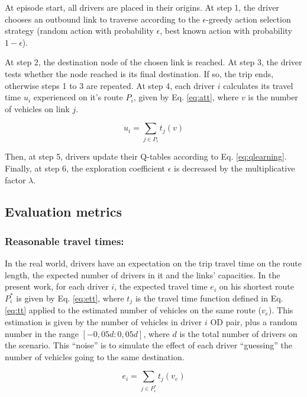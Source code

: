 \documentclass{RITA}
\newcommand{\route}[1]{\ensuremath{P_#1}}	%
\newcommand{\optRoute}[1]{\ensuremath{P_#1^*}}	%
\newcommand{\travTime}{\ensuremath{t_j}} 	%
\newcommand{\veh}{\ensuremath{v}}		%
\newcommand{\ett}[1]{\ensuremath{e_#1}}		%
\newcommand{\expVeh}{\ensuremath{v_e}}		%
\newcommand{\att}[1]{\ensuremath{u_#1}}		%
\begin{document}
At episode start, all drivers are placed in their origins. At step 1, the driver chooses an outbound link to traverse according to the $\epsilon$-greedy action selection strategy (random action with probability $\epsilon$, best known action with probability $1 - \epsilon$). %

At step 2, the destination node of the chosen link is reached. At step 3, the driver tests whether the node reached is its final destination. If so, the trip ends, otherwise steps 1 to 3 are repeated. At step 4, each driver $i$ calculates its travel time $\att{i}$ experienced on it's route $\route{i}$, given by Eq. \eqref{eq:att}, where $\veh$ is the number of vehicles on link $j$.

\begin{equation}
\label{eq:att}
\att{i} = \sum_{j \in \route{i}} \travTime(\veh)
\end{equation}


Then, at step 5, drivers update their Q-tables according to Eq. \eqref{eq:qlearning}. Finally, at step 6, the exploration coefficient $\epsilon$ is decreased by the multiplicative factor $\lambda$.

\subsection{Evaluation metrics}

\subsubsection{Reasonable travel times:}
In the real world, drivers have an expectation on the trip travel time on the route length, the expected number of drivers in it and the links' capacities. In the present work, for each driver $i$, the expected travel time $\ett{i}$ on his shortest route \optRoute{i} is given by Eq. \eqref{eq:ett}, where $\travTime$ is the travel time function defined in Eq. \eqref{eq:tt} applied to the estimated number of vehicles on the same route ($\expVeh$). This estimation is given by the number of vehicles in driver $i$ OD pair, plus a random number in the range $[-0,05d:0,05d]$, where $d$ is the total number of drivers on the scenario. This ``noise'' is to simulate the effect of each driver ``guessing'' the number of vehicles going to the same destination.

\begin{equation}
\label{eq:ett}
\ett{i} = \sum_{j \in \optRoute{i}}\travTime(\expVeh)
\end{equation}
\end{document}
